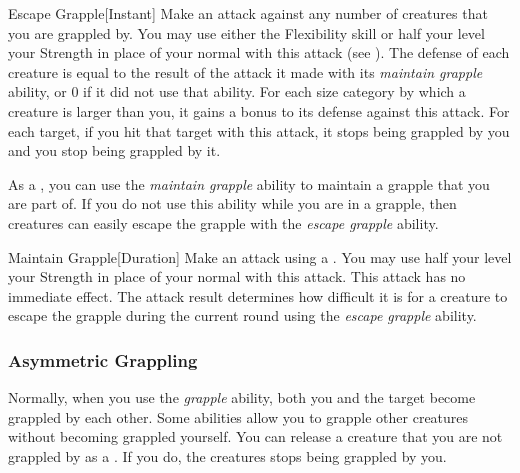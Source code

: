             \begin{instantability}{Escape Grapple}[Instant]
                \rankline
                Make an attack against any number of creatures that you are grappled by.
                You may use either the Flexibility skill or half your level \add your Strength in place of your normal  with this attack (see ).
                The defense of each creature is equal to the result of the attack it made with its \textit{maintain grapple} ability, or 0 if it did not use that ability.
                For each size category by which a creature is larger than you, it gains a  bonus to its defense against this attack.
                For each target, if you hit that target with this attack, it stops being grappled by you and you stop being grappled by it.
            \end{instantability}

            \label{Maintain Grapple} As a , you can use the \textit{maintain grapple} ability to maintain a grapple that you are part of.
            If you do not use this ability while you are in a grapple, then creatures can easily escape the grapple with the \textit{escape grapple} ability.
            \begin{instantability}{Maintain Grapple}[Duration]
                \rankline
                Make an attack using a .
                You may use half your level \add your Strength in place of your normal  with this attack.
                This attack has no immediate effect.
                The attack result determines how difficult it is for a creature to escape the grapple during the current round using the \textit{escape grapple} ability.
            \end{instantability}

        \subsubsection{Asymmetric Grappling}\label{Asymmetric Grappling}
            Normally, when you use the \textit{grapple} ability, both you and the target become grappled by each other.
            Some abilities allow you to grapple other creatures without becoming grappled yourself.
            You can release a creature that you are not grappled by as a .
            If you do, the creatures stops being grappled by you.

